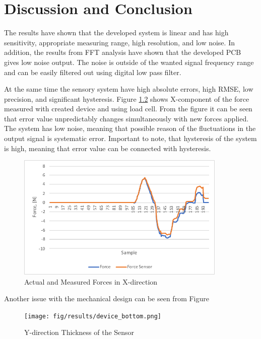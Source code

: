 \chapter{Discussion and Conclusion}
\label{discuss} %

The results have shown that the developed system is linear and has high sensitivity, appropriate measuring range, high resolution, and low noise. In addition, the results from FFT analysis have shown that the developed PCB gives low noise output. The noise is outside of the wanted signal frequency range and can be easily filtered out using digital low pass filter.

At the same time the sensory system have high absolute errors, high RMSE, low precision, and significant hysteresis. Figure \ref{fig:Syst_err} shows X-component of the force measured with created device and using load cell. From the figure it can be seen that error value unpredictably changes simultaneously with new forces applied. The system has low noise, meaning that possible reason of the fluctuations in the output signal is systematic error. Important to note, that hysteresis of the system is high, meaning that error value can be connected with hysteresis.

\begin{figure}[h]
	\begin{center}
	\includegraphics[width=100mm]{fig/results/syst_error.pdf}
	\end{center}
	\vspace{-4mm}
	\caption[Actual and Measured Forces in X-direction]
	{Actual and Measured Forces in X-direction}
	\label{fig:Syst_err}
	\vspace{-2mm}
\end{figure}

Another issue with the mechanical design can be seen from Figure

\begin{figure}[h]
	\begin{center}
	\texttt{[image: fig/results/device\_bottom.png]}
	\end{center}
	\vspace{-4mm}
	\caption[Y-direction Thickness of the Sensor]
	{Y-direction Thickness of the Sensor}
	\label{fig:Syst_err}
	\vspace{-2mm}
\end{figure}

